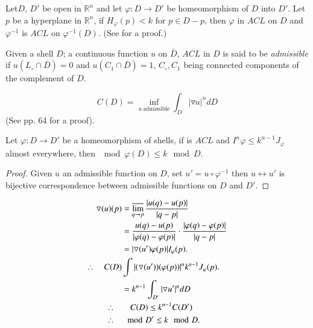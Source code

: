 \begin{lemma} \label{chap10:lem10.8}
  Let\pageoriginale $D$, $D'$ be open in $\mathbb{R}^n$ and let $\varphi: D \to D'$
  be homeomorphism of $D$ into $D'$. Let $p$ be a hyperplane in
  $\mathbb{R}^n$, if $H_\varphi(p)< k$ for $p \in D-p$, then $\varphi$
  in $ACL$ on $D$ and $\varphi^{-1}$ is $ACL$ on
  $\varphi^{-1}(D)$. \hfill (See \cite{17} for a proof.)
\end{lemma}

\begin{defi*}
  Given a shell $D$; a continuous function $u$ on $\bar{D}$, $ACL$ in
  $D$ is said to be \textit{admissible} if $u (L_\circ \cap
  \bar{D})=0$ and $u (C_1 \cap \bar{D})=1$, $C_\circ, C_1$ being
  connected components of the complement of $D$. 
\end{defi*}

\begin{lemma} \label{chap10:lem10.9}
  $$C(D) = \inf_{u~\text{admissible}} \int_D |\triangledown  u|^n dD$$
  \hfill (See \cite{17} pp. 64 for a proof).
\end{lemma}

\begin{lemma} \label{chap10:lem10.10}
  Let $\varphi: D \to D'$ be a homeomorphism of shells, if is $ACL$
  and $I^n \varphi \leq k^{n-1} J_\varphi$ almost everywhere, then
  $\mod \varphi(D) \leq k \mod D$.
\end{lemma}

\begin{proof}
  Given $u$ an admissible function on $D$, set $u'= u \circ
  \varphi^{-1}$ then $u \leftrightarrow u'$ is bijective
  correspondence between admissible functions on $D$ and $D'$.
\end{proof}

\begin{align*}
  \triangledown (u) (p) & = \varlimsup_{q \to p} \frac{|u (q) - u
    (p)|}{|q-p|} \\
  & = \frac{u(q) - u(p)}{|\varphi (q) - \varphi(p)|}\cdot
  \frac{|\varphi (q)- \varphi (p)|}{|q-p|}\\
  & = |\triangledown (u') \varphi (p)| I_\varphi (p).\\
  \therefore \quad C(D) & \int|(\triangledown (u'))(\varphi(p))|^n
  k^{n-1} J_{\varphi}(p).\\
  & = k^{n-1} \int_{D'} |\triangledown u'|^n dD\\
  \therefore \quad & \quad C(D) \leq  k^{n-1} C(D')\\
  \therefore \quad & \mod D' \leq k \mod D.
\end{align*}

